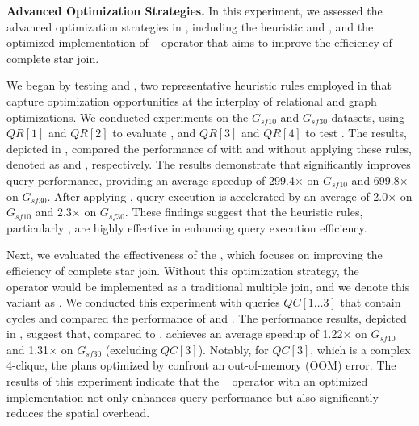 \noindent\textbf{Advanced Optimization Strategies.}
In this experiment, we assessed the advanced optimization strategies in \name, including the heuristic \filterrule and \joinfuserule, and the optimized implementation of \expandintersect~ operator that aims to improve the efficiency of complete star join.

We began by testing \filterrule and \joinfuserule, two representative heuristic rules employed in \name that capture optimization opportunities at the interplay of relational and graph optimizations. We conducted experiments on the $G_{sf10}$ and $G_{sf30}$ datasets, using $QR[1]$ and $QR[2]$ to evaluate \filterrule, and $QR[3]$ and $QR[4]$ to test \joinfuserule. The results, depicted in , compared the performance of \name with and without applying these rules, denoted as \name and \relgonofi, respectively.
The results demonstrate that \filterrule significantly improves query performance, providing an average speedup of 299.4$\times$ on $G_{sf10}$ and 699.8$\times$ on $G_{sf30}$. After applying \joinfuserule, query execution is accelerated by an average of 2.0$\times$ on $G_{sf10}$ and 2.3$\times$ on $G_{sf30}$. These findings suggest that the heuristic rules, particularly \filterrule, are highly effective in enhancing query execution efficiency.

\enlargethispage{1em}

Next, we evaluated the effectiveness of the \expandintersect, which focuses on improving the efficiency of complete star join. Without this optimization strategy, the \expandintersect~ operator would be implemented as a traditional multiple join, and we denote this variant as \relgomj. We conducted this experiment with queries $QC[1 \ldots 3]$ that contain cycles and compared the performance of \name and \relgomj.
The performance results, depicted in , suggest that, compared to \relgomj, \name achieves an average speedup of 1.22$\times$ on $G_{sf10}$ and 1.31$\times$ on $G_{sf30}$ (excluding $QC[3]$). Notably, for $QC[3]$, which is a complex 4-clique, the plans optimized by \relgomj confront an out-of-memory (OOM) error. %
The results of this experiment indicate that the \expandintersect~ operator with an optimized implementation not only enhances query performance but also significantly reduces the spatial overhead.

